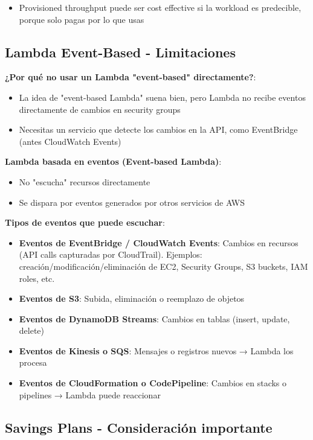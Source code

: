 \documentclass[12pt,a4paper]{report}
\begin{document}
\begin{itemize}
    \item Provisioned throughput puede ser cost effective si la workload es predecible, porque solo pagas por lo que usas
\end{itemize}

\subsection{Lambda Event-Based - Limitaciones}

\textbf{¿Por qué no usar un Lambda "event-based" directamente?}:
\begin{itemize}
    \item La idea de "event-based Lambda" suena bien, pero Lambda no recibe eventos directamente de cambios en security groups
    \item Necesitas un servicio que detecte los cambios en la API, como EventBridge (antes CloudWatch Events)
\end{itemize}

\textbf{Lambda basada en eventos (Event-based Lambda)}:
\begin{itemize}
    \item No "escucha" recursos directamente
    \item Se dispara por eventos generados por otros servicios de AWS
\end{itemize}

\textbf{Tipos de eventos que puede escuchar}:
\begin{itemize}
    \item \textbf{Eventos de EventBridge / CloudWatch Events}: Cambios en recursos (API calls capturadas por CloudTrail). Ejemplos: creación/modificación/eliminación de EC2, Security Groups, S3 buckets, IAM roles, etc.
    \item \textbf{Eventos de S3}: Subida, eliminación o reemplazo de objetos
    \item \textbf{Eventos de DynamoDB Streams}: Cambios en tablas (insert, update, delete)
    \item \textbf{Eventos de Kinesis o SQS}: Mensajes o registros nuevos → Lambda los procesa
    \item \textbf{Eventos de CloudFormation o CodePipeline}: Cambios en stacks o pipelines → Lambda puede reaccionar
\end{itemize}

\subsection{Savings Plans - Consideración importante}
\end{document}
